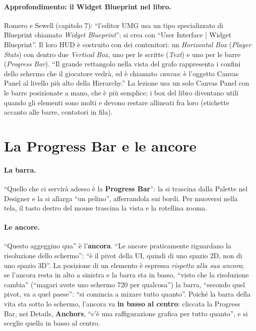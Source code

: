 \paragraph{Approfondimento: il Widget Blueprint nel libro.} Romero e Sewell (capitolo 7):
``l'editor UMG usa un tipo specializzato di Blueprint chiamato \emph{Widget
Blueprint}''; si crea con ``User Interface | Widget Blueprint''. Il loro HUD è costruito
con dei contenitori: un \emph{Horizontal Box} (\emph{Player Stats}) con dentro due
\emph{Vertical Box}, uno per le scritte (\emph{Text}) e uno per le barre (\emph{Progress
Bar}). ``Il grande rettangolo nella vista del grafo rappresenta i confini dello schermo
che il giocatore vedrà, ed è chiamato \emph{canvas}: è l'oggetto Canvas Panel al livello
più alto della Hierarchy.'' La lezione usa un solo Canvas Panel con le barre posizionate a
mano, che è più semplice; i box del libro diventano utili quando gli elementi sono molti e
devono restare allineati fra loro (etichette accanto alle barre, contatori in fila).

\section{La Progress Bar e le ancore}
\label{ue11:sec:progress}

\paragraph{La barra.} ``Quello che ci servirà adesso è la \textbf{Progress Bar}'': la si
trascina dalla Palette nel Designer e la si allarga ``un pelino'', afferrandola sui bordi.
Per muoversi nella tela, il tasto destro del mouse trascina la vista e la rotellina
zooma.

\paragraph{Le ancore.} ``Questo aggeggino qua'' è l'\textbf{ancora}. ``Le ancore
praticamente riguardano la risoluzione dello schermo'': ``è il pivot della UI, quindi di
uno spazio 2D, non di uno spazio 3D''. La posizione di un elemento è espressa
\emph{rispetto alla sua ancora}; se l'ancora resta in alto a sinistra e la barra sta in
basso, ``visto che la risoluzione cambia'' (``magari avete uno schermo 720 per qualcosa'')
la barra, ``secondo quel pivot, va a quel paese'': ``si comincia a mixare tutto quanto''.
Poiché la barra della vita sta sotto lo schermo, l'ancora va \textbf{in basso al centro}:
cliccata la Progress Bar, nei Details, \textbf{Anchors}, ``c'è una raffigurazione grafica
per tutto quanto'', e si sceglie quella in basso al centro.

